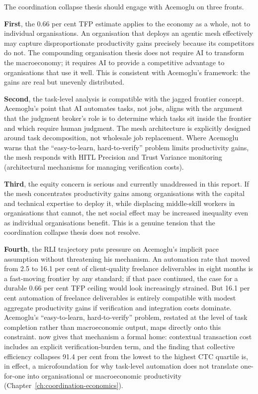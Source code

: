 The coordination collapse thesis should engage with Acemoglu on three fronts.

\textbf{First}, the 0.66 per cent TFP estimate applies to the economy as a whole, not to individual organisations. An organisation that deploys an agentic mesh effectively may capture disproportionate productivity gains precisely because its competitors do not. The compounding organisation thesis does not require AI to transform the macroeconomy; it requires AI to provide a competitive advantage to organisations that use it well. This is consistent with Acemoglu's framework: the gains are real but unevenly distributed.

\textbf{Second}, the task-level analysis is compatible with the jagged frontier concept. Acemoglu's point that AI automates tasks, not jobs, aligns with the argument that the judgment broker's role is to determine which tasks sit inside the frontier and which require human judgment. The mesh architecture is explicitly designed around task decomposition, not wholesale job replacement. Where Acemoglu warns that the ``easy-to-learn, hard-to-verify'' problem limits productivity gains, the mesh responds with HITL Precision and Trust Variance monitoring (architectural mechanisms for managing verification costs).

\textbf{Third}, the equity concern is serious and currently unaddressed in this report. If the mesh concentrates productivity gains among organisations with the capital and technical expertise to deploy it, while displacing middle-skill workers in organisations that cannot, the net social effect may be increased inequality even as individual organisations benefit. This is a genuine tension that the coordination collapse thesis does not resolve.

\textbf{Fourth}, the RLI trajectory \parencite{RLI2025, CAIS2026RLI} puts pressure on Acemoglu's implicit pace assumption without threatening his mechanism. An automation rate that moved from 2.5 to 16.1 per cent of client-quality freelance deliverables in eight months is a fast-moving frontier by any standard; if that pace continued, the case for a durable 0.66 per cent TFP ceiling would look increasingly strained. But 16.1 per cent automation of freelance deliverables is entirely compatible with modest aggregate productivity gains if verification and integration costs dominate. Acemoglu's ``easy-to-learn, hard-to-verify'' problem, restated at the level of task completion rather than macroeconomic output, maps directly onto this constraint. \textcite{Liu2026} now gives that mechanism a formal home: contextual transaction cost includes an explicit verification-burden term, and the finding that collective efficiency collapses 91.4 per cent from the lowest to the highest CTC quartile is, in effect, a microfoundation for why task-level automation does not translate one-for-one into organisational or macroeconomic productivity (Chapter~\ref{ch:coordination-economics}).

